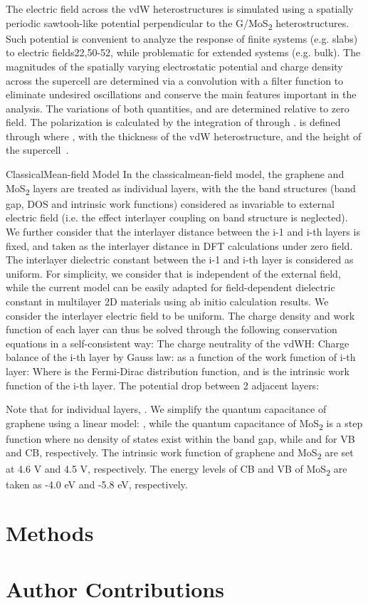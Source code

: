 The electric field   across the vdW heterostructures is simulated using a spatially periodic sawtooh-like potential   perpendicular to the G/MoS\textsubscript{2} heterostructures. Such potential is convenient to analyze the response of finite systems (e.g. slabs) to electric fields22,50-52, while problematic for extended systems (e.g. bulk).  The magnitudes of the spatially varying electrostatic potential and charge density   across the supercell are determined via a convolution with a filter function to eliminate undesired oscillations and conserve the main features important in the analysis. The variations of both quantities,  and  are determined relative to zero field. The polarization   is calculated by the integration of   through  .   is defined through   where   , with   the thickness of the vdW heterostructure, and    the height of the supercell~\cite{Santos_2013_ACSnano_kaxi,Santos_2013_tunable_eps_gr}.

ClassicalMean-field Model
In the classicalmean-field model, the graphene and MoS\textsubscript{2} layers are treated as individual layers, with the the band structures (band gap, DOS and intrinsic work functions) considered as invariable to external electric field (i.e. the effect interlayer coupling on band structure is neglected). We further consider that the interlayer distance  between the i-1 and i-th layers is fixed, and taken as the interlayer distance in DFT calculations under zero field. The interlayer dielectric constant  between the i-1 and i-th layer is considered as uniform. For simplicity, we consider that  is independent of the external field, while the current model can be easily adapted for field-dependent dielectric constant in multilayer 2D materials using ab initio calculation results. We consider the interlayer electric field   to be uniform. The charge density   and work function   of each layer can thus be solved through the following conservation equations in a self-consistent way:
	The charge neutrality of the vdWH:
	Charge balance of the i-th layer by Gauss law:
	 as a function of the work function  of i-th layer:
Where   is the Fermi-Dirac distribution function, and   is the intrinsic work function of the i-th layer. 
	The potential drop between 2 adjacent layers:

Note that for individual layers,   . We simplify the quantum capacitance of graphene using a linear model:  , while the quantum capacitance of MoS\textsubscript{2} is a step function where no density of states exist within the band gap, while  and   for VB and CB, respectively. The intrinsic work function of graphene and MoS\textsubscript{2} are set at 4.6 V and 4.5 V, respectively. The energy levels of CB and VB of MoS\textsubscript{2} are taken as -4.0 eV and -5.8 eV, respectively.

\section{Methods}
\label{sec:asym-methods}

\section{Author Contributions}
\label{sec:asym-author-contributions}








